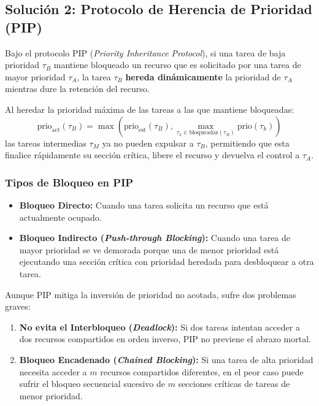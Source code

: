 \subsection{Solución 2: Protocolo de Herencia de Prioridad (PIP)}
\begin{definicion}
Bajo el protocolo PIP (\textit{Priority Inheritance Protocol}), si una tarea de baja prioridad $\tau_B$ mantiene bloqueado un recurso que es solicitado por una tarea de mayor prioridad $\tau_A$, la tarea $\tau_B$ \textbf{hereda dinámicamente} la prioridad de $\tau_A$ mientras dure la retención del recurso.
\end{definicion}

Al heredar la prioridad máxima de las tareas a las que mantiene bloqueadas:
$$\text{prio}_{\text{act}}(\tau_B) = \max \left( \text{prio}_{\text{est}}(\tau_B), \max_{\tau_k \in \text{bloqueadas}(\tau_B)} \text{prio}(\tau_k) \right)$$
las tareas intermedias $\tau_M$ ya no pueden expulsar a $\tau_B$, permitiendo que esta finalice rápidamente su sección crítica, libere el recurso y devuelva el control a $\tau_A$.

\subsubsection{Tipos de Bloqueo en PIP}
\begin{itemize}[leftmargin=*]
    \item \textbf{Bloqueo Directo:} Cuando una tarea solicita un recurso que está actualmente ocupado.
    \item \textbf{Bloqueo Indirecto (\textit{Push-through Blocking}):} Cuando una tarea de mayor prioridad se ve demorada porque una de menor prioridad está ejecutando una sección crítica con prioridad heredada para desbloquear a otra tarea.
\end{itemize}

\begin{aviso}
Aunque PIP mitiga la inversión de prioridad no acotada, sufre dos problemas graves:
\begin{enumerate}
    \item \textbf{No evita el Interbloqueo (\textit{Deadlock}):} Si dos tareas intentan acceder a dos recursos compartidos en orden inverso, PIP no previene el abrazo mortal.
    \item \textbf{Bloqueo Encadenado (\textit{Chained Blocking}):} Si una tarea de alta prioridad necesita acceder a $m$ recursos compartidos diferentes, en el peor caso puede sufrir el bloqueo secuencial sucesivo de $m$ secciones críticas de tareas de menor prioridad.
\end{enumerate}
\end{aviso}

